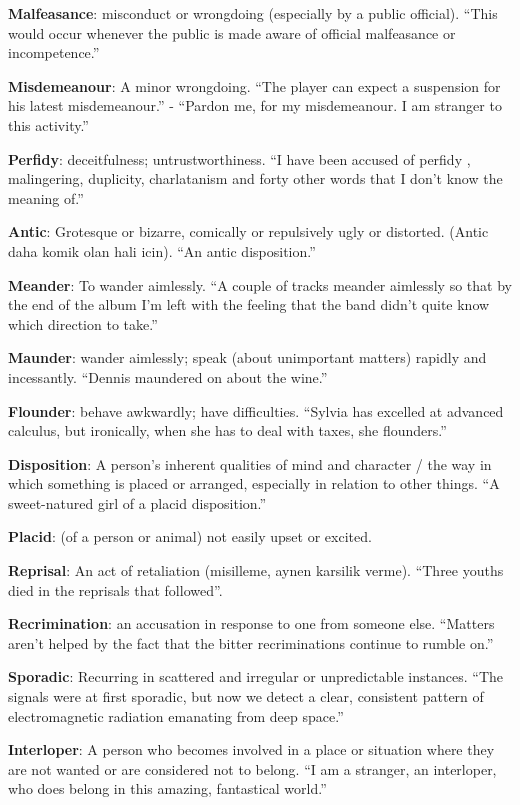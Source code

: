 \documentclass[12pt, a4paper]{ximera}
\begin{document}
\textbf{Malfeasance}: misconduct or wrongdoing (especially by a public official). ``This would occur whenever the public is made aware of official malfeasance or incompetence.''

\textbf{Misdemeanour}: A minor wrongdoing. ``The player can expect a suspension for his latest misdemeanour.'' - ``Pardon me, for my misdemeanour. I am stranger to this activity.''

\textbf{Perfidy}: deceitfulness; untrustworthiness. ``I have been accused of perfidy , malingering, duplicity, charlatanism and forty other words that I don't know the meaning of.''

\textbf{Antic}: Grotesque or bizarre, comically or repulsively ugly or distorted. (Antic daha komik olan hali icin). ``An antic disposition.''

\textbf{Meander}: To wander aimlessly. ``A couple of tracks meander aimlessly so that by the end of the album I'm left with the feeling that the band didn't quite know which direction to take.''

\textbf{Maunder}: wander aimlessly; speak (about unimportant matters) rapidly and incessantly. ``Dennis maundered on about the wine.''

\textbf{Flounder}: behave awkwardly; have difficulties. ``Sylvia has excelled at advanced calculus, but ironically, when she has to deal with taxes, she flounders.''

\textbf{Disposition}: A person's inherent qualities of mind and character / the way in which something is placed or arranged, especially in relation to other things. ``A sweet-natured girl of a placid disposition.''

\textbf{Placid}: (of a person or animal) not easily upset or excited.

\textbf{Reprisal}: An act of retaliation (misilleme, aynen karsilik verme). ``Three youths died in the reprisals that followed''.

\textbf{Recrimination}: an accusation in response to one from someone else. ``Matters aren't helped by the fact that the bitter recriminations continue to rumble on.''

\textbf{Sporadic}: Recurring in scattered and irregular or unpredictable instances. ``The signals were at first sporadic, but now we detect a clear, consistent pattern of electromagnetic radiation emanating from deep space.''

\textbf{Interloper}: A person who becomes involved in a place or situation where they are not wanted or are considered not to belong. ``I am a stranger, an interloper, who does belong in this amazing, fantastical world.''
\end{document}
